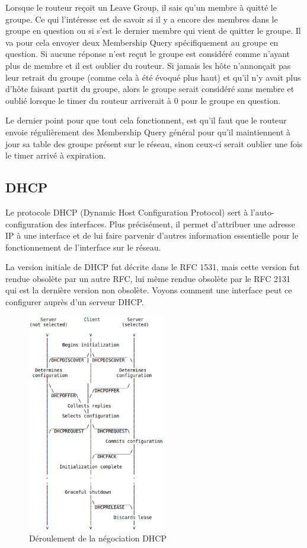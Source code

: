 Lorsque le routeur reçoit un Leave Group, il sais qu'un membre à quitté le
groupe. Ce qui l'intéresse est de savoir si il y a encore des membres dans le
groupe en question ou si s'est le dernier membre qui vient de quitter le
groupe. Il va pour cela envoyer deux Membership Query spécifiquement au groupe
en question. Si aucune réponse n'est reçut le groupe est considéré comme
n'ayant plus de membre et il est oublier du routeur.  Si jamais les hôte
n'annonçait pas leur retrait du groupe (comme cela à été évoqué plus haut) et
qu'il n'y avait plus d'hôte faisant partit du groupe, alors le groupe serait
considéré sans membre et oublié lorsque le timer du routeur arriverait à 0 pour
le groupe en question.

\smallbreak
Le dernier point pour que tout cela fonctionnent, est qu'il faut que le routeur
envoie régulièrement des Membership Query général pour qu'il maintiennent à
jour sa table des groupe présent sur le réseau, sinon ceux-ci serait oublier
une fois le timer arrivé à expiration.



\subsection{DHCP}
Le protocole DHCP (Dynamic Host Configuration Protocol) sert à l'auto-configuration
des interfaces. Plus précisément, il  permet d'attribuer une adresse IP à une
interface et de lui faire parvenir d'autres information essentielle pour le
fonctionnement de l'interface sur le réseau. 

\newpage
La version initiale de DHCP fut décrite dans le RFC 1531\cite{url-RFC-DHCP1},
mais cette version fut rendue obsolète par un autre RFC, lui même rendue
obsolète par le RFC 2131\cite{url-RFC-DHCP2} qui est la dernière version non
obsolète. Voyons comment une interface peut ce configurer auprès d'un serveur
DHCP.

\begin{figure}[h]
\centering
\includegraphics[width=6cm]{./pics/timeline_dhcp.eps}
\caption{Déroulement de la négociation DHCP}
\label{fig:timelinedhcp}
\end{figure}

